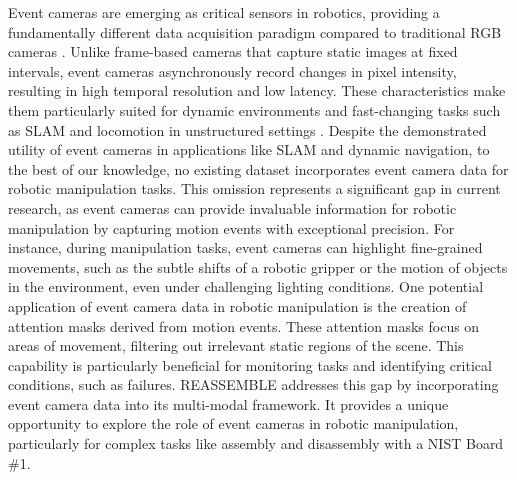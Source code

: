 Event cameras are emerging as critical sensors in robotics, providing a fundamentally different data acquisition paradigm compared to traditional RGB cameras \cite{gehrig2024low}. Unlike frame-based cameras that capture static images at fixed intervals, event cameras asynchronously record changes in pixel intensity, resulting in high temporal resolution and low latency. These characteristics make them particularly suited for dynamic environments and fast-changing tasks such as SLAM and locomotion in unstructured settings \cite{eslam}. Despite the demonstrated utility of event cameras in applications like SLAM and dynamic navigation, to the best of our knowledge, no existing dataset incorporates event camera data for robotic manipulation tasks. This omission represents a significant gap in current research, as event cameras can provide invaluable information for robotic manipulation by capturing motion events with exceptional precision. For instance, during manipulation tasks, event cameras can highlight fine-grained movements, such as the subtle shifts of a robotic gripper or the motion of objects in the environment, even under challenging lighting conditions. One potential application of event camera data in robotic manipulation is the creation of attention masks derived from motion events. These attention masks focus on areas of movement, filtering out irrelevant static regions of the scene. This capability is particularly beneficial for monitoring tasks and identifying critical conditions, such as failures. REASSEMBLE addresses this gap by incorporating event camera data into its multi-modal framework. It provides a unique opportunity to explore the role of event cameras in robotic manipulation, particularly for complex tasks like assembly and disassembly with a NIST Board \#1.
